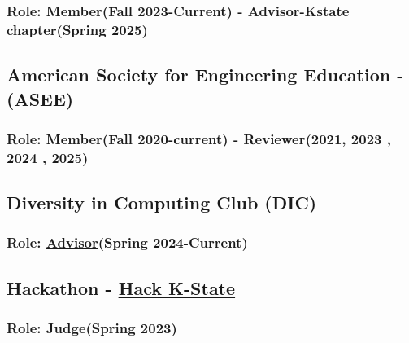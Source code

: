 \documentclass[11pt]{article}
\begin{document}
\subsubsection{ \normalfont Role: Member(Fall 2023-Current) - Advisor-Kstate chapter(Spring 2025)  }
\vspace{0.5em} %

\subsection{American Society for Engineering Education - (ASEE) \hfill  \normalfont    }
\subsubsection{\normalfont Role: Member(Fall 2020-current) - Reviewer(2021, 2023 {\href{https://ksuemailprod-my.sharepoint.com/:b:/g/personal/safia_ksu_edu/EWK_XZXJOGBEnH548AQ3_1UBEaWK0H4SrvoqV1gzne7wDw?e=wVeXI7}{\color{icnclr} \faCertificate[regular] }}, 2024 {\href{https://ksuemailprod-my.sharepoint.com/:b:/g/personal/safia_ksu_edu/EZeU2M_nmiBJonqwmHarQ6IBt8jost0KJ0caw3H0cDGnnw?e=sBjYB8}{\color{icnclr} \faCertificate[regular] }}, 2025) }
\vspace{0.5em} %

\subsection{ Diversity in Computing Club (DIC) \hfill  \normalfont   }
\subsubsection{ \normalfont Role: {\href{https://orgcentral.k-state.edu/dic/home/}{Advisor}(Spring 2024-Current)}}
\vspace{0.5em} %



\subsection{ Hackathon - {\href{https://hackkstate.tech/}{Hack K-State}}  \hfill  \normalfont }
\subsubsection{ \normalfont Role: Judge(Spring 2023)}
\vspace{0.5em} %
\end{document}

